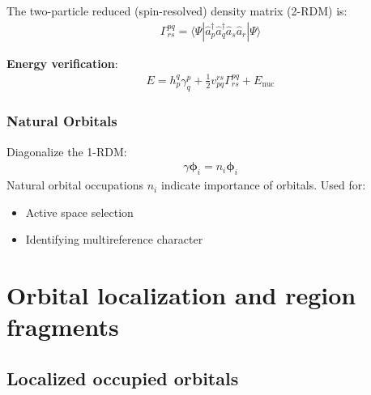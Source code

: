 \documentclass[a4paper,12pt,oneside]{book}
\newcommand{\beq}{\begin{equation}\begin{aligned}}
\newcommand{\eeq}{\end{aligned}\end{equation}}
\newcommand{\op}{\hat}
\newcommand{\vect}{\mathbf}
\begin{document}
The two-particle reduced (spin-resolved) density matrix (2-RDM) is:
\beq
\Gamma^{pq}_{rs} = \langle \Psi | \op{a}^\dagger_p \op{a}^\dagger_q \op{a}_s \op{a}_r | \Psi \rangle
\eeq

\textbf{Energy verification}:
\beq
E = h_p^q \gamma^p_q + \frac{1}{2} v_{pq}^{rs} \Gamma^{pq}_{rs} + E_{\text{nuc}}
\eeq

\subsection{Natural Orbitals}

Diagonalize the 1-RDM:
\beq
\gamma \vect{\phi}_i = n_i \vect{\phi}_i
\eeq
Natural orbital occupations $n_i$ indicate importance of orbitals. Used for:
\begin{itemize}
\item Active space selection 
\item Identifying multireference character
\end{itemize}


\chapter{Orbital localization and region fragments}

\section{Localized occupied orbitals}
\end{document}
